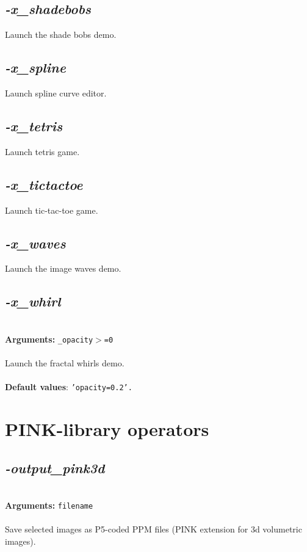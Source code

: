 \documentclass[a4paper,11pt,twoside]{book}
\begin{document}
\subsection{\emph{-x\_shadebobs} }\vspace*{-0.5em}
Launch the shade bobs demo.


\subsection{\emph{-x\_spline} }\vspace*{-0.5em}
Launch spline curve editor.


\subsection{\emph{-x\_tetris} }\vspace*{-0.5em}
Launch tetris game.


\subsection{\emph{-x\_tictactoe} }\vspace*{-0.5em}
Launch tic-tac-toe game.


\subsection{\emph{-x\_waves} }\vspace*{-0.5em}
Launch the image waves demo.


\subsection{\emph{-x\_whirl} }\vspace*{-0.5em}
~\\\textbf{Arguments: } 
{\small \texttt{\_opacity$>$=0}}\\~\\
Launch the fractal whirls demo.
~\\~\\\textbf{Default values}: {\small \texttt{'opacity=0.2'.}}

\section{PINK-library operators}


\subsection{\emph{-output\_pink3d} }\vspace*{-0.5em}
~\\\textbf{Arguments: } 
{\small \texttt{filename}}\\~\\
Save selected images as P5-coded PPM files (PINK extension for 3d volumetric images).
\end{document}
